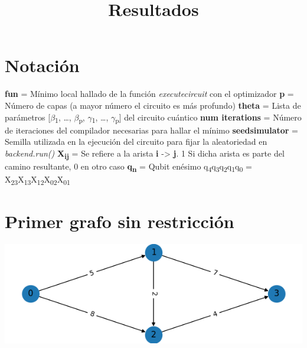 \documentclass[letterpaper]{article}
\date{}
\title{Resultados}
\begin{document}
\maketitle
\tableofcontents


\section{Notación}
\label{sec:org1bd3946}
\textbf{fun} = Mínimo local hallado de la función \emph{execute\textunderscore circuit} con el optimizador
\newline
\textbf{p} = Número de capas (a mayor número el circuito es más profundo)
\newline
\textbf{theta} = Lista de parámetros [\(\beta\)\textsubscript{1}, \ldots{}, \(\beta\)\textsubscript{p}, \(\gamma\)\textsubscript{1}, \ldots{}, \(\gamma\)\textsubscript{p}] del circuito cuántico
\newline
\textbf{num iterations} = Número de iteraciones del compilador necesarias para hallar el mínimo
\newline
\textbf{seed\textunderscore simulator} = Semilla utilizada en la ejecución del circuito para fijar la aleatoriedad en \emph{backend.run()}
\newline
\textbf{X\textsubscript{ij}} = Se refiere a la arista \textbf{i} -> \textbf{j}. 1 Si dicha arista es parte del camino resultante, 0 en otro caso
\newline
\textbf{q\textsubscript{n}} = Qubit enésimo
\newline
q\textsubscript{4}q\textsubscript{3}q\textsubscript{2}q\textsubscript{1}q\textsubscript{0} = X\textsubscript{23}X\textsubscript{13}X\textsubscript{12}X\textsubscript{02}X\textsubscript{01}
\newpage

\section{Primer grafo sin restricción}
\label{sec:orgfe1dae6}
\begin{center}
\includegraphics[width=.9\linewidth]{../img/primer_grafo/primer_grafo.png}
\end{center}
\newpage
\end{document}

